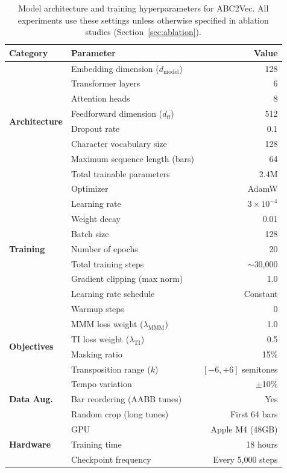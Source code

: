 \documentclass[]{interact}
\theoremstyle{plain}
\theoremstyle{definition}
\theoremstyle{remark}
\begin{document}
\begin{table}[!htb]
\centering
\caption{Model architecture and training hyperparameters for ABC2Vec. All experiments use these settings unless otherwise specified in ablation studies (Section~\ref{sec:ablation}).}
\label{tab:hyperparameters}
\begin{tabular}{@{}llr@{}}
\toprule
\textbf{Category} & \textbf{Parameter} & \textbf{Value} \\
\midrule
\multirow{8}{*}{\textbf{Architecture}}
& Embedding dimension ($d_\text{model}$) & 128 \\
& Transformer layers & 6 \\
& Attention heads & 8 \\
& Feedforward dimension ($d_\text{ff}$) & 512 \\
& Dropout rate & 0.1 \\
& Character vocabulary size & 128 \\
& Maximum sequence length (bars) & 64 \\
& Total trainable parameters & 2.4M \\
\midrule
\multirow{9}{*}{\textbf{Training}}
& Optimizer & AdamW \\
& Learning rate & $3 \times 10^{-4}$ \\
& Weight decay & 0.01 \\
& Batch size & 128 \\
& Number of epochs & 20 \\
& Total training steps & $\sim$30,000 \\
& Gradient clipping (max norm) & 1.0 \\
& Learning rate schedule & Constant \\
& Warmup steps & 0 \\
\midrule
\multirow{4}{*}{\textbf{Objectives}}
& MMM loss weight ($\lambda_\text{MMM}$) & 1.0 \\
& TI loss weight ($\lambda_\text{TI}$) & 0.5 \\
& Masking ratio & 15\% \\
& Transposition range ($k$) & $[-6, +6]$ semitones \\
\midrule
\multirow{3}{*}{\textbf{Data Aug.}}
& Tempo variation & $\pm$10\% \\
& Bar reordering (AABB tunes) & Yes \\
& Random crop (long tunes) & First 64 bars \\
\midrule
\multirow{3}{*}{\textbf{Hardware}}
& GPU & Apple M4 (48GB) \\
& Training time & 18 hours \\
& Checkpoint frequency & Every 5,000 steps \\
\bottomrule
\end{tabular}
\end{table}
\end{document}
